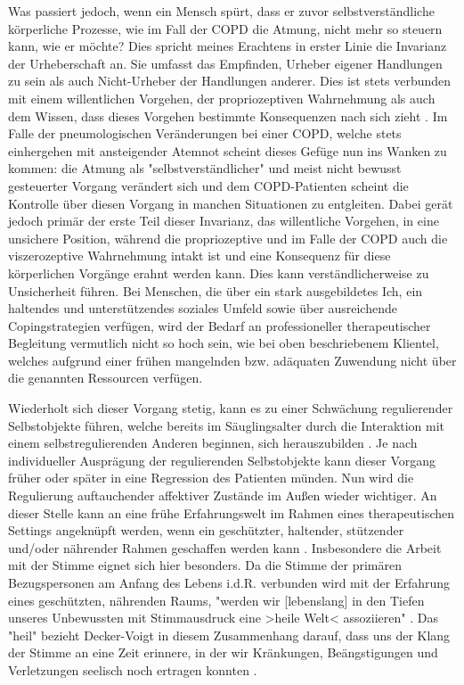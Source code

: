 Was passiert jedoch, wenn ein Mensch spürt, dass er zuvor selbstverständliche körperliche Prozesse, wie im Fall der COPD die Atmung, nicht mehr so steuern kann, wie er möchte? Dies spricht meines Erachtens in erster Linie die Invarianz der Urheberschaft an. Sie umfasst das Empfinden, Urheber eigener Handlungen zu sein als auch Nicht-Urheber der Handlungen anderer. Dies ist stets verbunden mit einem willentlichen Vorgehen, der propriozeptiven Wahrnehmung als auch dem Wissen, dass dieses Vorgehen bestimmte Konsequenzen nach sich zieht \autocite[vgl.][106, 114f.]{stern2007}. Im Falle der pneumologischen Veränderungen bei einer COPD, welche stets einhergehen mit ansteigender Atemnot scheint dieses Gefüge nun ins Wanken zu kommen: die Atmung als "selbstverständlicher" und meist nicht bewusst gesteuerter Vorgang verändert sich und dem COPD-Patienten scheint die Kontrolle über diesen Vorgang in manchen Situationen zu entgleiten. Dabei gerät jedoch primär der erste Teil dieser Invarianz, das willentliche Vorgehen, in eine unsichere Position, während die propriozeptive und im Falle der COPD auch die viszerozeptive Wahrnehmung intakt ist und eine Konsequenz für diese körperlichen Vorgänge erahnt werden kann. Dies kann verständlicherweise zu Unsicherheit führen. Bei Menschen, die über ein stark ausgebildetes Ich, ein haltendes und unterstützendes soziales Umfeld sowie über ausreichende Copingstrategien verfügen, wird der Bedarf an professioneller therapeutischer Begleitung vermutlich nicht so hoch sein, wie bei oben beschriebenem Klientel, welches aufgrund einer frühen mangelnden bzw. adäquaten Zuwendung nicht über die genannten Ressourcen verfügen. 

Wiederholt sich dieser Vorgang stetig, kann es zu einer Schwächung regulierender Selbstobjekte führen, welche bereits im Säuglingsalter durch die Interaktion mit einem selbstregulierenden Anderen beginnen, sich herauszubilden \autocite[vgl.][338f.]{stern2007}. Je nach individueller Ausprägung der regulierenden Selbstobjekte kann dieser Vorgang früher oder später in eine Regression des Patienten münden. Nun wird die Regulierung auftauchender affektiver Zustände im Außen wieder wichtiger. 
An dieser Stelle kann an eine frühe Erfahrungswelt im Rahmen eines therapeutischen Settings angeknüpft werden, wenn ein geschützter, haltender, stützender und/oder nährender Rahmen geschaffen werden kann \autocite[vgl.][58ff.]{timmermann2008}. Insbesondere die Arbeit mit der Stimme eignet sich hier besonders. Da die Stimme der primären Bezugspersonen am Anfang des Lebens i.d.R. verbunden wird mit der Erfahrung eines geschützten, nährenden Raums, "werden wir [lebenslang] in den Tiefen unseres Unbewussten mit Stimmausdruck eine >heile Welt< assoziieren" \autocite[282]{deckervoigt2000}. Das "heil" bezieht Decker-Voigt in diesem Zusammenhang darauf, dass uns der Klang der Stimme an eine Zeit erinnere, in der wir Kränkungen, Beängstigungen und Verletzungen seelisch noch ertragen konnten \autocite[vgl.][282]{deckervoigt2000}. 

